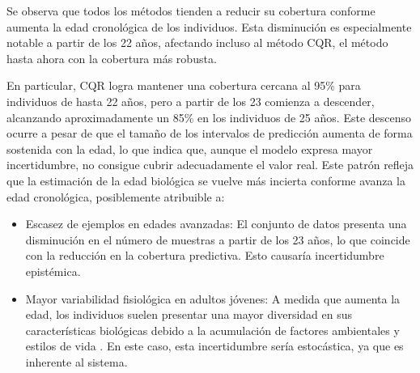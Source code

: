 Se observa que todos los métodos tienden a reducir su cobertura conforme aumenta la edad cronológica de los individuos. Esta disminución es especialmente notable a partir de los 22 años, afectando incluso al método CQR, el método hasta ahora con la cobertura más robusta.

En particular, CQR logra mantener una cobertura cercana al 95\% para individuos de hasta 22 años, pero a partir de los 23 comienza a descender, alcanzando aproximadamente un 85\% en los individuos de 25 años. Este descenso ocurre a pesar de que el tamaño de los intervalos de predicción aumenta de forma sostenida con la edad, lo que indica que, aunque el modelo expresa mayor incertidumbre, no consigue cubrir adecuadamente el valor real. Este patrón refleja que la estimación de la edad biológica se vuelve más incierta conforme avanza la edad cronológica, posiblemente atribuible a:

\begin{itemize}

    \item Escasez de ejemplos en edades avanzadas: El conjunto de datos presenta una disminución en el número de muestras a partir de los 23 años, lo que coincide con la reducción en la cobertura predictiva. Esto causaría incertidumbre epistémica.
    
    \item Mayor variabilidad fisiológica en adultos jóvenes: A medida que aumenta la edad, los individuos suelen presentar una mayor diversidad en sus características biológicas debido a la acumulación de factores ambientales y estilos de vida \cite{ubelaker2018, scheuer2004}. En este caso, esta incertidumbre sería estocástica, ya que es inherente al sistema. 

\end{itemize}


